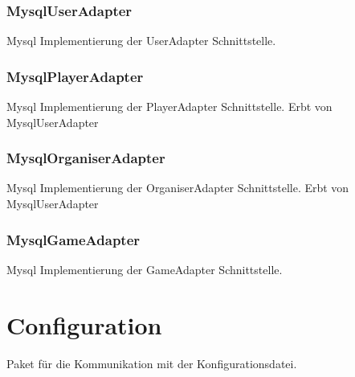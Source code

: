 \documentclass[a4paper]{scrreprt}
\begin{document}
	\subsubsection{MysqlUserAdapter}
	Mysql Implementierung der UserAdapter Schnittstelle.
	
	\subsubsection{MysqlPlayerAdapter}
	Mysql Implementierung der PlayerAdapter Schnittstelle.
	Erbt von MysqlUserAdapter
	
	\subsubsection{MysqlOrganiserAdapter}
	Mysql Implementierung der OrganiserAdapter Schnittstelle.
	Erbt von MysqlUserAdapter
	
	\subsubsection{MysqlGameAdapter}
	Mysql Implementierung der GameAdapter Schnittstelle.
	
	\section{Configuration}
	Paket für die Kommunikation mit der Konfigurationsdatei.
	
\end{document}
